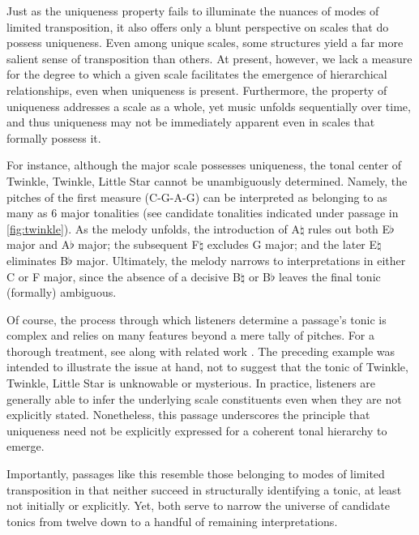 \documentclass[10pt,twocolumn]{article}
\numberwithin{equation}{section} %
\begin{document}
    Just as the uniqueness property fails to illuminate the nuances of modes of limited transposition, it also offers only a blunt perspective on scales that do possess uniqueness.
    Even among unique scales, some structures yield a far more salient sense of transposition than others.
    At present, however, we lack a measure for the degree to which a given scale facilitates the emergence of hierarchical relationships, even when uniqueness is present.
    Furthermore, the property of uniqueness addresses a scale as a whole, yet music unfolds sequentially over time, and thus uniqueness may not be immediately apparent even in scales that formally possess it.

    For instance, although the major scale possesses uniqueness, the tonal center of Twinkle, Twinkle, Little Star cannot be unambiguously determined.
    Namely, the pitches of the first measure (C-G-A-G) can be interpreted as belonging to as many as 6 major tonalities (see candidate tonalities indicated under passage in \autoref{fig:twinkle}).
    As the melody unfolds, the introduction of A$\natural$ rules out both E$\flat$ major and A$\flat$ major; the subsequent F$\natural$ excludes G major; and the later E$\natural$ eliminates B$\flat$ major.
    Ultimately, the melody narrows to interpretations in either C or F major, since the absence of a decisive B$\natural$ or B$\flat$ leaves the final tonic (formally) ambiguous.

    Of course, the process through which listeners determine a passage's tonic is complex and relies on many features beyond a mere tally of pitches.
    For a thorough treatment, see \citet{LerdahlJackendoff1983} along with related work \citep{BharuchaKrumhansl1983,Lerdahl2004,Patel1998,Thompson1997}.
    The preceding example was intended to illustrate the issue at hand, not to suggest that the tonic of Twinkle, Twinkle, Little Star is unknowable or mysterious.
    In practice, listeners are generally able to infer the underlying scale constituents even when they are not explicitly stated.
    Nonetheless, this passage underscores the principle that uniqueness need not be explicitly expressed for a coherent tonal hierarchy to emerge.

    Importantly, passages like this resemble those belonging to modes of limited transposition in that neither succeed in structurally identifying a tonic, at least not initially or explicitly.
    Yet, both serve to narrow the universe of candidate tonics from twelve down to a handful of remaining interpretations.
\end{document}
